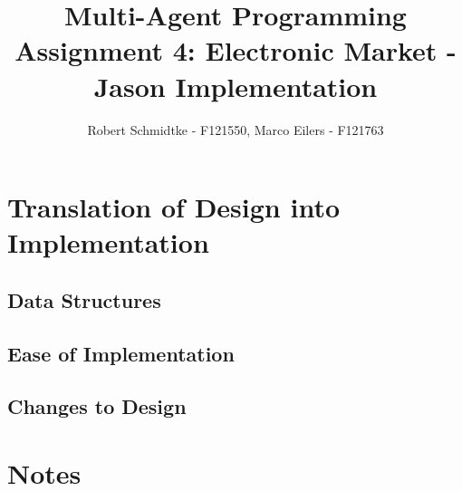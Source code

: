 \documentclass[a4paper,11pt]{article}
\begin{document}
\title{Multi-Agent Programming\\Assignment 4: Electronic Market - Jason Implementation}
\author{Robert Schmidtke - F121550, Marco Eilers - F121763}

\maketitle
\newpage

\section{Translation of Design into Implementation}

\subsection{Data Structures}

\subsection{Ease of Implementation}

\subsection{Changes to Design}

\section{Notes}
\end{document}
